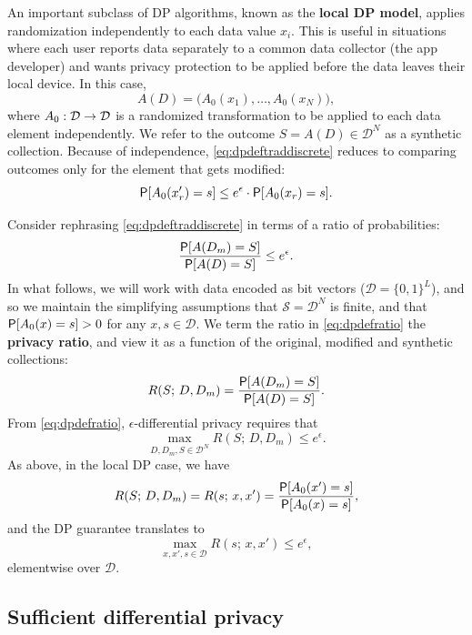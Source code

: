 \documentclass[11pt]{article}
\newcommand{\Dsp}{\mathcal{D}}
\newcommand{\Ssp}{\mathcal{S}}
\begin{document}
An important subclass of DP algorithms, known as the \textbf{local DP model}, applies randomization independently to each data value $x_i$.
This is useful in situations where each user reports data separately to a common data collector (\eg the app developer) and wants privacy protection to be applied before the data leaves their local device.
In this case,
\begin{equation} \label{eq:localdpmodel}
A(D) = \big(A_0(x_1),\dots,A_0(x_N)\big),
\end{equation}
where $\map{A_0}{\Dsp}{\Dsp}$ is a randomized transformation to be applied to each data element independently.
We refer to the outcome $S = A(D) \in\Dsp^N$ as a synthetic collection.
Because of independence, \eqref{eq:dpdeftraddiscrete} reduces to comparing outcomes only for the element that gets modified:
\begin{equation} \label{eq:dpdeflocal}
\P[A_0(x'_r) = s] \leq e^\epsilon \cdot\P[A_0(x_r) = s].
\end{equation}

Consider rephrasing \eqref{eq:dpdeftraddiscrete} in terms of a ratio of probabilities:
\begin{equation} \label{eq:dpdefratio}
\frac{\P[A(D_m) = S]}{\P[A(D) = S]} \leq e^\epsilon.
\end{equation}
In what follows, we will work with data encoded as bit vectors ($\Dsp = \{0,1\}^L$), and so we maintain the simplifying assumptions that $\Ssp = \Dsp^N$ is finite, and that $\P[A_0(x) = s] > 0$ for any $x, s\in\Dsp$.
We term the ratio in \eqref{eq:dpdefratio} the \textbf{privacy ratio}, and view it as a function of the original, modified and synthetic collections:
\begin{equation*}
R(S;\,D,D_m) = \frac{\P[A(D_m) = S]}{\P[A(D) = S]}.
\end{equation*}
From \eqref{eq:dpdefratio}, $\epsilon$-differential privacy requires that
\[ \max_{D, D_m, S\in\Dsp^N} R(S;\,D,D_m) \leq e^\epsilon. \]
As above, in the local DP case, we have
\begin{equation*}
R(S;\,D,D_m) = R(s;\,x,x') = \frac{\P[A_0(x') = s]}{\P[A_0(x) = s]},
\end{equation*}
and the DP guarantee translates to
\begin{equation*}
\max_{x, x', s\in\Dsp} R(s;\,x,x') \leq e^\epsilon,
\end{equation*}
elementwise over $\Dsp$.

\subsection{Sufficient differential privacy}
\end{document}
